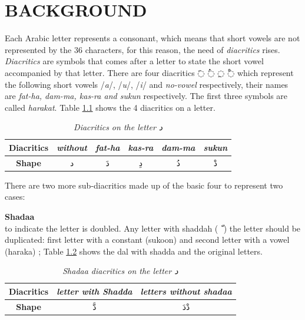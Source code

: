 \chapter{\uppercase{Background}}

Each Arabic letter represents a consonant, which means that short vowels are not
represented by the 36 characters, for this reason, the need of \textit{diacritics}
rises. \textit{Diacritics} are symbols that comes after a letter to state the
short vowel accompanied by that letter. There are four diacritics \textarabic{◌َ} \textarabic{◌ُ}
\textarabic{◌ِ} \textarabic{◌ْ} which represent the following short vowels
/\textit{a}/, /\textit{u}/, /\textit{i}/ and \textit{no-vowel} respectively,
their names are \textit{fat-ha, dam-ma, kas-ra and sukun} respectively.  The first
three symbols are called \textit{harakat}. Table \ref{tables:diacritics_dal}
shows the 4 diacritics on a letter.



\begin{table}[H]
	\centering
	\begin{tabular}{c c c c c c}
		\toprule
		\textbf{\small{Diacritics}}     & \small{\textit{without}} & \small{\textit{fat-ha}} &
		\small{\textit{kas-ra}} & \small{\textit{dam-ma}} & \small{\textit{sukun}}\\
		\midrule
		\textbf{\small{Shape}}   & \textarabic{د} & \textarabic{دَ} & \textarabic{دِ} &
		\textarabic{دُ} & \textarabic{دْ}\\
		\bottomrule
	\end{tabular}
	\caption{\textit{Diacritics on the letter  \textarabic{ د }}}\label{tables:diacritics_dal}
\end{table}



There are two more sub-diacritics made up of the basic four to represent two
cases:
\begin{definition}\label{def:shadaa_definition}
  \textbf{Shadaa}  \hfill \\
to indicate the letter is doubled. Any letter with
shaddah (\textarabic{ ّ } ) the letter should be duplicated: first letter with a
constant (sukoon) and second letter with a vowel (haraka) \cite{Alnagdawi2013}; Table  \ref{tables:shadda_dal}
shows the dal with shadda and the original letters.

\begin{table}[H]
	\centering
	\begin{tabular}{c c c}
		\toprule
		\textbf{\small{Diacritics}} & \small{\textit{letter with Shadda }} & \small{\textit{letters without shadaa  }} \\
		\midrule
		\textbf{\small{Shape}}  & \textarabic{دَّ} &  \textarabic{دْدَ}\\
		\bottomrule
	\end{tabular}
	\caption{\textit{Shadaa diacritics on the letter  \textarabic{ د }}}\label{tables:shadda_dal}
\end{table}

\end{definition}

